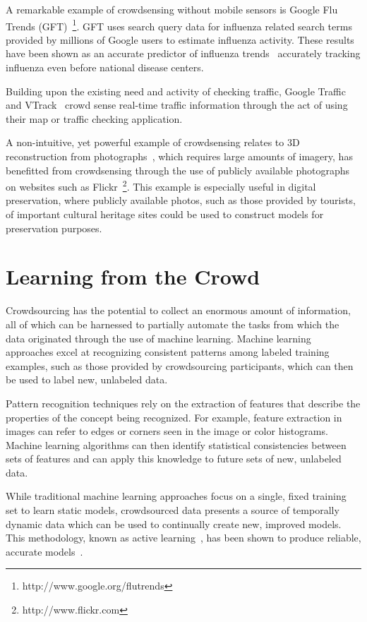 \documentclass[10pt,twocolumn]{article}
\begin{document}
A remarkable example of crowdsensing without mobile sensors is
Google Flu Trends (GFT)~\footnote{http://www.google.org/flutrends}. 
GFT uses search query data for influenza related search terms provided 
by millions of Google users to estimate influenza activity. These 
results have been shown as an accurate predictor of influenza 
trends~\cite{Dugas2012} accurately tracking influenza even before 
national disease centers.

Building upon the existing need and activity of checking
traffic, Google Traffic~\cite{GoogleTraffic} and VTrack~\cite{Thiagarajan2009}
crowd sense real-time traffic information through the act of
using their map or traffic checking application.

A non-intuitive, yet powerful example of crowdsensing relates
to 3D reconstruction from photographs~\cite{Agarwal2009,Frahm2010},
which requires large amounts of imagery, has benefitted from
crowdsensing through the use of publicly available photographs
on websites such as Flickr~\footnote{http://www.flickr.com}. This 
example is especially useful in digital preservation, where 
publicly available photos, such as those provided by tourists,
of important cultural heritage sites could be used to construct
models for preservation purposes.


\section{Learning from the Crowd}
\label{sec:learning}

Crowdsourcing has the potential to collect an enormous amount of
information, all of which can be harnessed to partially automate
the tasks from which the data originated through the use of 
machine learning. Machine learning approaches excel at recognizing
consistent patterns among labeled training examples, such as those
provided by crowdsourcing participants, which can then be used to 
label new, unlabeled data.

Pattern recognition techniques rely on the extraction of features
that describe the properties of the concept being recognized. For
example, feature extraction in images can refer to edges or corners 
seen in the image or color histograms. Machine learning algorithms
can then identify statistical consistencies between sets of
features and can apply this knowledge to future sets of new,
unlabeled data.

While traditional machine learning approaches focus on a single,
fixed training set to learn static models, crowdsourced data presents
a source of temporally dynamic data which can be used to continually
create new, improved models. This methodology, known as active 
learning~\cite{Settles2010}, has been shown to produce reliable,
accurate models~\cite{Barrington2012}.
\end{document}

